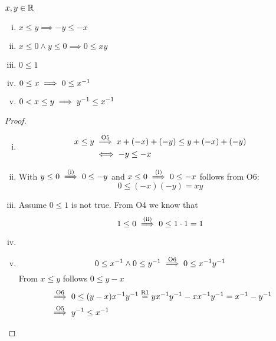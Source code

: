 \documentclass[../../script.tex]{subfiles}
\begin{document}
\begin{thm}
$x, y \in \mathbb{R}$
\begin{enumerate}[(i)]
	\item $x \le y \implies -y \le -x$
	\item $x \le 0 \wedge y \le 0 \implies 0 \le xy$
	\item $0 \le 1$
	\item $0 \le x \implies 0 \le {x}^{-1}$
	\item $0 < x \le y \implies {y}^{-1} \le {x}^{-1}$
\end{enumerate}
\end{thm}
\begin{proof}\leavevmode
\begin{enumerate}[(i)]
	\item 
	\begin{equation}
	\begin{split}
		x \le y &\overset{\text{O5}}{\implies} x + (-x) + (-y) \le y + (-x) + (-y) \\
		&\iff -y \le -x
	\end{split}
	\end{equation}
	
	\item With $y \le 0 \overset{\text{(i)}}{\implies} 0 \le -y$ and $x \le 0 \overset{\text{(i)}}{\implies} 0 \le -x$ follows from O6:
	\begin{equation}
		0 \le (-x)(-y) = xy
	\end{equation}
	
	\item Assume $0 \le 1$ is not true. From O4 we know that
	\begin{equation}
		1 \le 0 \overset{\text{(ii)}}{\implies} 0 \le 1 \cdot 1 = 1
	\end{equation}
	
	\item \reader
	
	\item
	\begin{equation}
		0 \le {x}^{-1} \wedge 0 \le {y}^{-1} \overset{\text{O6}}{\implies} 0 \le {x}^{-1}{y}^{-1}
	\end{equation}
	From $x \le y$ follows $0 \le y - x$
	\begin{align}
		&\overset{\text{O6}}{\implies} 0 \le (y - x){x}^{-1}{y}^{-1} \stackrel{\text{R1}}{=} y{x}^{-1}{y}^{-1} - x{x}^{-1}{y}^{-1} = {x}^{-1} - {y}^{-1} \\
		&\overset{\text{O5}}{\implies} {y}^{-1} \le {x}^{-1}
	\end{align}
\end{enumerate}
\end{proof}
\end{document}
